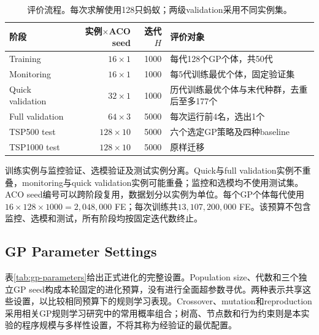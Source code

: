 \begin{table}[tb]
\caption{评价流程。每次求解使用128只蚂蚁；两级validation采用不同实例集。}
\label{tab:protocol}
\small
\begin{tabularx}{\textwidth}{@{}lrrY@{}}
\toprule
阶段 & 实例$\times$ACO seed & 迭代$H$ & 评价对象\\ \midrule
Training & $16\times1$ & 1000 & 每代128个GP个体，共50代\\
Monitoring & $16\times1$ & 1000 & 每5代训练最优个体，固定验证集\\
Quick validation & $32\times1$ & 1000 & 历代训练最优个体与末代种群，去重后至多177个\\
Full validation & $64\times3$ & 5000 & 每次运行前4名，选出1个\\
TSP500 test & $128\times10$ & 5000 & 六个选定GP策略及四种baseline\\
TSP1000 test & $128\times10$ & 5000 & 原样迁移\\
\bottomrule
\end{tabularx}
\end{table}

训练实例与监控验证、选模验证及测试实例分离。Quick与full validation实例不重叠，monitoring与quick validation实例可能重叠；监控和选模均不使用测试集。ACO seed编号可以跨阶段复用，数据划分以实例为单位。每个GP个体每代使用$16\times128\times1000=2{,}048{,}000$ FE；每次训练共$13{,}107{,}200{,}000$ FE。该预算不包含监控、选模和测试，所有阶段均按固定迭代数终止。

\subsection{GP Parameter Settings}
\label{sec:gp-settings}
表\ref{tab:gp-parameters}给出正式进化的完整设置。Population size、代数和三个独立GP seed构成本轮固定的进化预算，没有进行全面超参数寻优。两种表示共享这些设置，以比较相同预算下的规则学习表现。Crossover、mutation和reproduction采用相关GP规则学习研究中的常用概率组合\cite{zhang2018multitree,sun2024multicloud}；树高、节点数和行为约束则是本实验的程序规模与多样性设置，不将其称为经验证的最优配置。

